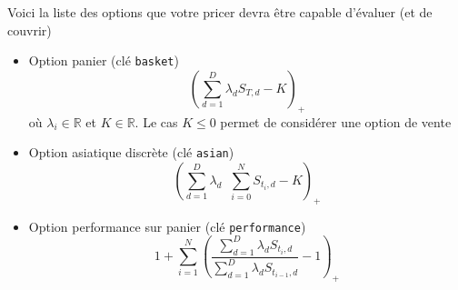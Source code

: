 \documentclass[a4paper,11pt]{article}
\def\R{{\mathbb R}}
\def\inv#1{\mathop{\frac{1}{ #1}}\nolimits}
\begin{document}
Voici la liste des options que votre pricer devra être capable d'évaluer (et de couvrir)
\begin{itemize}
\item Option panier (clé \verb!basket!)
  \begin{equation*}
    \left( \sum_{d=1}^D \lambda_d S_{T,d} - K \right)_+
  \end{equation*}
  où $\lambda_i \in \R$ et $K \in \R$. Le cas $K \le 0$ permet de considérer une
  option de vente

\item Option asiatique discrète (clé \verb!asian!)
  \begin{equation*}
    \left(\sum_{d=1}^D \lambda_d \inv{N+1} \sum_{i=0}^{N} S_{t_i,d} - K\right)_+
  \end{equation*}

\item Option performance sur panier (clé \verb!performance!)
  \begin{equation*}
    1 + \sum_{i=1}^N \left( \frac{\sum_{d=1}^D \lambda_d
        S_{t_i,d}}{\sum_{d=1}^D \lambda_d
        S_{t_{i-1},d}} - 1 \right)_+
  \end{equation*}
\end{itemize}
\end{document}

